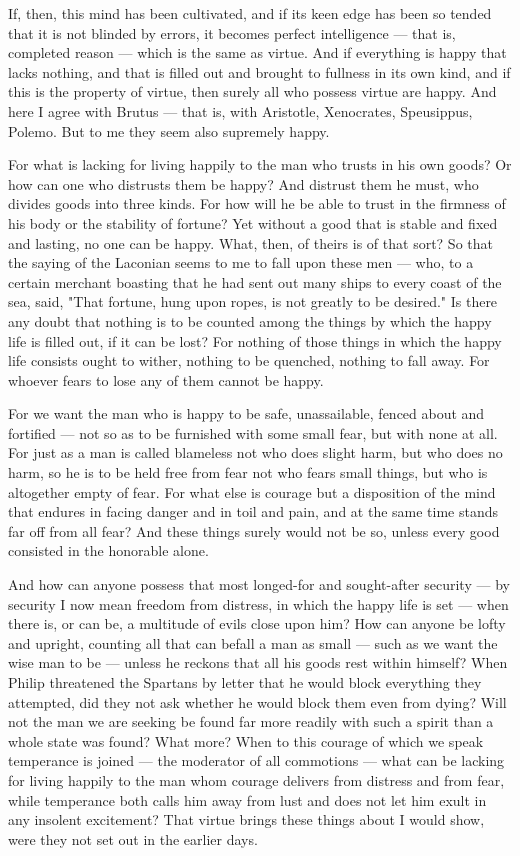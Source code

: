  If, then, this mind has been cultivated, and if its keen edge has been so tended that it is not blinded by errors, it becomes perfect intelligence — that is, completed reason — which is the same as virtue. And if everything is happy that lacks nothing, and that is filled out and brought to fullness in its own kind, and if this is the property of virtue, then surely all who possess virtue are happy. And here I agree with Brutus — that is, with Aristotle, Xenocrates, Speusippus, Polemo. But to me they seem also supremely happy.

 For what is lacking for living happily to the man who trusts in his own goods? Or how can one who distrusts them be happy? And distrust them he must, who divides goods into three kinds. For how will he be able to trust in the firmness of his body or the stability of fortune? Yet without a good that is stable and fixed and lasting, no one can be happy. What, then, of theirs is of that sort? So that the saying of the Laconian seems to me to fall upon these men — who, to a certain merchant boasting that he had sent out many ships to every coast of the sea, said, "That fortune, hung upon ropes, is not greatly to be desired." Is there any doubt that nothing is to be counted among the things by which the happy life is filled out, if it can be lost? For nothing of those things in which the happy life consists ought to wither, nothing to be quenched, nothing to fall away. For whoever fears to lose any of them cannot be happy.

 For we want the man who is happy to be safe, unassailable, fenced about and fortified — not so as to be furnished with some small fear, but with none at all. For just as a man is called blameless not who does slight harm, but who does no harm, so he is to be held free from fear not who fears small things, but who is altogether empty of fear. For what else is courage but a disposition of the mind that endures in facing danger and in toil and pain, and at the same time stands far off from all fear? And these things surely would not be so, unless every good consisted in the honorable alone.

 And how can anyone possess that most longed-for and sought-after security — by security I now mean freedom from distress, in which the happy life is set — when there is, or can be, a multitude of evils close upon him? How can anyone be lofty and upright, counting all that can befall a man as small — such as we want the wise man to be — unless he reckons that all his goods rest within himself? When Philip threatened the Spartans by letter that he would block everything they attempted, did they not ask whether he would block them even from dying? Will not the man we are seeking be found far more readily with such a spirit than a whole state was found? What more? When to this courage of which we speak temperance is joined — the moderator of all commotions — what can be lacking for living happily to the man whom courage delivers from distress and from fear, while temperance both calls him away from lust and does not let him exult in any insolent excitement? That virtue brings these things about I would show, were they not set out in the earlier days.

